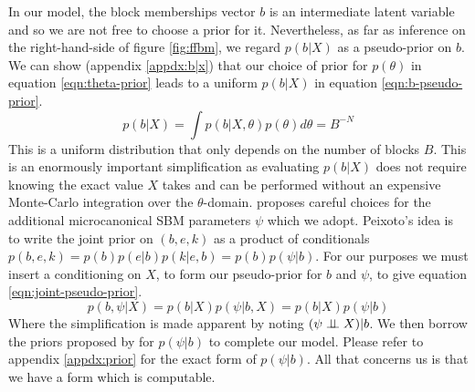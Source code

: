 In our model, the block memberships vector $b$ is an intermediate latent variable and so we are not free to choose a prior for it. Nevertheless, as far as inference on the right-hand-side of figure \ref{fig:ffbm}, we regard $p(b | X)$ as a pseudo-prior on $b$. We can show (appendix \ref{appdx:b|x}) that our choice of prior for $p(\theta)$ in equation \ref{eqn:theta-prior} leads to a uniform $p(b | X)$ in equation \ref{eqn:b-pseudo-prior}.
%
\begin{equation}
	p(b | X) = \int p(b | X, \theta) p(\theta) d\theta = B^{-N}
	\label{eqn:b-pseudo-prior}
\end{equation}
%
This is a uniform distribution that only depends on the number of blocks $B$. This is an enormously important simplification as evaluating $p(b | X)$ does not require knowing the exact value $X$ takes and can be performed without an expensive Monte-Carlo integration over the $\theta$-domain. \citet{Peixoto-Bayesian-Microcanonical} proposes careful choices for the additional microcanonical SBM parameters $\psi$ which we adopt. Peixoto's idea is to write the joint prior on $(b, e, k)$ as a product of conditionals $p(b, e, k) = p(b) p(e | b) p(k | e, b)= p(b) p(\psi | b)$. For our purposes we must insert a conditioning on $X$, to form our pseudo-prior for $b$ and $\psi$, to give equation \ref{eqn:joint-pseudo-prior}.
%
\begin{equation}
	p(b, \psi | X) = p(b | X) p(\psi | b, X) = p(b | X) p(\psi | b)
	\label{eqn:joint-pseudo-prior}
\end{equation}
%
Where the simplification is made apparent by noting $(\psi \perp \!\!\! \perp X) | b$. We then borrow the priors proposed by \citet{Peixoto-Bayesian-Microcanonical} for $p(\psi | b)$ to complete our model. Please refer to appendix \ref{appdx:prior} for the exact form of $p(\psi | b)$. All that concerns us is that we have a form which is computable.
